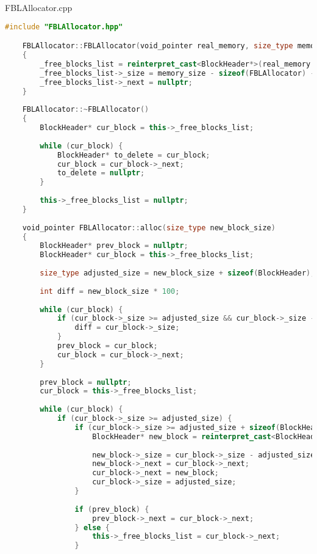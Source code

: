 \documentclass[a4paper, 12pt]{article}
\begin{document}
FBLAllocator.cpp
\begin{lstlisting}[language=C++]
    #include "FBLAllocator.hpp"

    FBLAllocator::FBLAllocator(void_pointer real_memory, size_type memory_size)
    {
        _free_blocks_list = reinterpret_cast<BlockHeader*>(real_memory + sizeof(FBLAllocator));
        _free_blocks_list->_size = memory_size - sizeof(FBLAllocator) - sizeof(BlockHeader);
        _free_blocks_list->_next = nullptr;
    }
    
    FBLAllocator::~FBLAllocator()
    {
        BlockHeader* cur_block = this->_free_blocks_list;
    
        while (cur_block) {
            BlockHeader* to_delete = cur_block;
            cur_block = cur_block->_next;
            to_delete = nullptr;
        }
    
        this->_free_blocks_list = nullptr;
    }
    
    void_pointer FBLAllocator::alloc(size_type new_block_size)
    {
        BlockHeader* prev_block = nullptr;
        BlockHeader* cur_block = this->_free_blocks_list;
    
        size_type adjusted_size = new_block_size + sizeof(BlockHeader);
    
        int diff = new_block_size * 100;
    
        while (cur_block) {
            if (cur_block->_size >= adjusted_size && cur_block->_size - adjusted_size < diff) {
                diff = cur_block->_size;
            }
            prev_block = cur_block;
            cur_block = cur_block->_next;
        }
    
        prev_block = nullptr;
        cur_block = this->_free_blocks_list;
    
        while (cur_block) {
            if (cur_block->_size >= adjusted_size) {
                if (cur_block->_size >= adjusted_size + sizeof(BlockHeader)) {
                    BlockHeader* new_block = reinterpret_cast<BlockHeader*>(reinterpret_cast<int8_t*>(cur_block) + adjusted_size);
    
                    new_block->_size = cur_block->_size - adjusted_size - sizeof(BlockHeader);
                    new_block->_next = cur_block->_next;
                    cur_block->_next = new_block;
                    cur_block->_size = adjusted_size;
                }
    
                if (prev_block) {
                    prev_block->_next = cur_block->_next;
                } else {
                    this->_free_blocks_list = cur_block->_next;
                }
    

\end{lstlisting}
\end{document}

